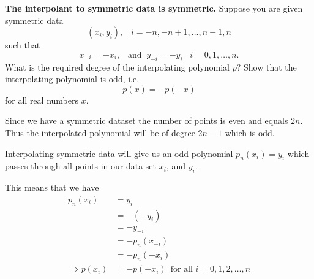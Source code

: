 \textbf{The interpolant to symmetric data is symmetric.} Suppose you
are given symmetric data \[(x_i, y_i), \;\;\; i= -n, -n+1, \dots, n-1,
n\] such that \[x_{-i} = -x_i, \;\;\; \text{and} \;\; y_{-i} = -y_i
\;\;\; i=0,1,\dots,n.\]
What is the required degree of the interpolating polynomial $p$? Show
that the interpolating polynomial is odd, i.e. \[p(x) = -p(-x)\] for
all real numbers $x$.

{\color{blue}

Since we have a symmetric dataset the number of points is even and
equals $2n$. Thus the interpolated polynomial will be of degree $2n -
1$ which is odd.

Interpolating symmetric data will give us an odd polynomial $p_n(x_i) =
y_i$ which passes through all points in our data set $x_i$, and $y_i$.

This means that we have
\begin{align*}
p_n(x_i) &= y_i \\
          &= -(-y_i) \\
          &= -y_{-i} \\
          &= - p_n(x_{-i}) \\
          &= - p_n(-x_i) \\
\Rightarrow p(x_i) &= -p(-x_i) \,\,\, \text{for all } i = 0,1,2,\dots,n
\end{align*}

}
